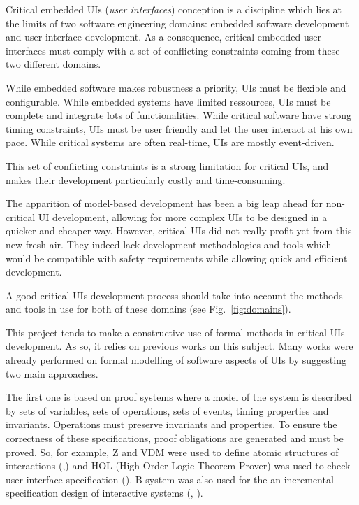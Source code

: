 \documentclass{sigchi}
\begin{document}
Critical  embedded  UIs   (\emph{user  interfaces})  conception  is  a
discipline  which  lies at  the  limits  of  two software  engineering
domains:   embedded   software    development   and   user   interface
development. As a consequence,  critical embedded user interfaces must
comply with  a set  of conflicting constraints  coming from  these two
different domains.

While  embedded software  makes robustness  a priority,  UIs  must be
flexible  and  configurable.   While  embedded  systems  have  limited
ressources,   UIs   must   be   complete   and   integrate   lots   of
functionalities.   While   critical   software  have   strong   timing
constraints, UIs  must be user friendly  and let the  user interact at
his  own pace.  While critical  systems are  often real-time,  UIs are
mostly event-driven.

This  set  of conflicting  constraints  is  a  strong limitation  for
critical  UIs, and  makes  their development  particularly costly  and
time-consuming.

The apparition  of model-based development  has been a big  leap ahead
for non-critical UI  development, allowing for more complex  UIs to be
designed in a  quicker and cheaper way. However,  critical UIs did not
really  profit  yet  from  this   new  fresh  air.  They  indeed  lack
development  methodologies and  tools which  would be  compatible with
safety requirements while allowing quick and efficient development.

A good critical  UIs development process should take  into account the
methods   and  tools   in  use   for  both   of  these   domains  (see
Fig.~\ref{fig:domains}).

This project  tends to  make a constructive  use of formal  methods in
critical UIs development.  As so, it relies on  previous works on this
subject.  Many works  were already  performed on  formal  modelling of
software aspects of UIs by suggesting two main approaches. 

The first one is based on proof systems where a model of the system is
described by  sets of variables,  sets of operations, sets  of events,
timing properties and  invariants. Operations must preserve invariants
and  properties. To  ensure the  correctness of  these specifications,
proof obligations are generated and must be proved. So, for example, Z
and  VDM  were  used  to  define  atomic  structures  of  interactions
(\cite{Duke-Harrison93a},\cite{Duke-Harrison93b}) and  HOL (High Order
Logic Theorem  Prover) was used to check  user interface specification
(\cite{Bumbulis96}).  B  system was also  used for the  an incremental
specification   design   of   interactive  systems   (\cite{yamine98},
\cite{yamine04}).
\end{document}
